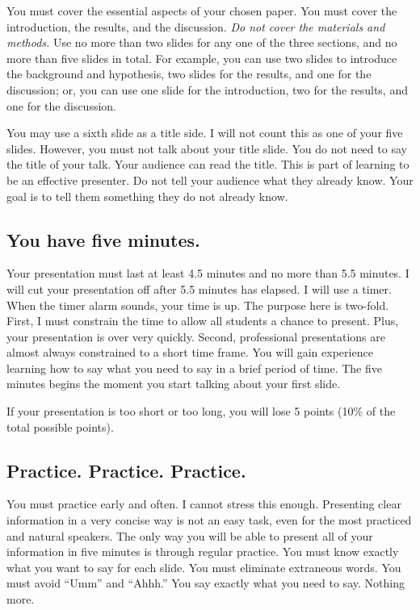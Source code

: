 \documentclass[letterpaper]{memoir}
\newcommand{\insertslide}[2]{%
  \framebox{\texttt{[image: \#2]}}
}
\begin{document}
You must cover the essential aspects of your chosen paper. You must cover the introduction, the results, and the discussion. \emph{Do not cover the materials and methods.} Use no more than two slides for any one of the three sections, and no more than five slides in total. For example, you can use two slides to introduce the background and hypothesis, two slides for the results, and one for the discussion; or, you can use one slide for the introduction, two for the results, and one for the discussion.

You may use a sixth slide as a title side. I will not count this as one of your five slides. However, you must not talk about your title slide. You do not need to say the title of your talk. Your audience can read the title. This is part of learning to be an effective presenter. Do not tell your audience what they already know. Your goal is to tell them something they do not already know.

\subsection*{You have five minutes.}


Your presentation must last at least 4.5 minutes and no more than 5.5 minutes. I will cut your presentation off after 5.5 minutes has elapsed. I will use a timer. When the timer alarm sounds, your time is up. The purpose here is two-fold. First, I must constrain the time to allow all students a chance to present. Plus, your presentation is over very quickly. Second, professional presentations are almost always constrained to a short time frame. You will gain experience learning how to say what you need to say in a brief period of time.  The five minutes begins the moment you start talking about your first slide. \sidepar{\insertslide{3}{5_in_5_overview.pdf}}

If your presentation is too short or too long, you will lose 5 points (10\% of the total possible points).

\subsection*{Practice. Practice. Practice.}


You must practice early and often. I cannot stress this enough. Presenting clear information in a very concise way is not an easy task, even for the most practiced and natural speakers. The only way you will be able to present all of your information in five minutes is through regular practice. You must know exactly what you want to say for each slide. You must eliminate extraneous words. You must avoid “Umm” and “Ahhh.” You say exactly what you need to say. Nothing more. \sidepar{\insertslide{8}{5_in_5_overview.pdf}}
\end{document}
